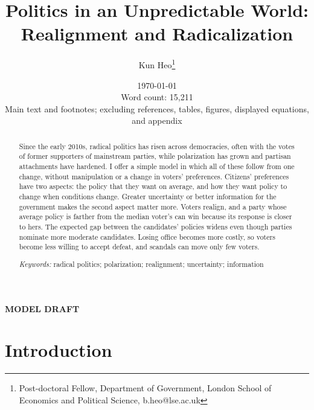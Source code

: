 \documentclass[12pt,letterpaper]{article}
\begin{document}
\begin{titlepage}
\title{\Large Politics in an Unpredictable World: Realignment and Radicalization}
\author{Kun Heo\footnote{Post-doctoral Fellow, Department of Government, London School of Economics and Political Science, b.heo@lse.ac.uk}}
\date{\today\\[1.5ex] {\normalsize Word count: 15,211}\\[0.3ex] {\footnotesize Main text and footnotes; excluding references, tables, figures, displayed equations, and appendix}}
\maketitle
\begin{center}\textbf{MODEL DRAFT}\end{center}
\begin{abstract}
\noindent Since the early 2010s, radical politics has risen across democracies, often with the votes of former supporters of mainstream parties, while polarization has grown and partisan attachments have hardened. I offer a simple model in which all of these follow from one change, without manipulation or a change in voters' preferences. Citizens' preferences have two aspects: the policy that they want on average, and how they want policy to change when conditions change. Greater uncertainty or better information for the government makes the second aspect matter more. Voters realign, and a party whose average policy is farther from the median voter's can win because its response is closer to hers. The expected gap between the candidates' policies widens even though parties nominate more moderate candidates. Losing office becomes more costly, so voters become less willing to accept defeat, and scandals can move only few voters.

\medskip\noindent\textit{Keywords:} radical politics; polarization; realignment; uncertainty; information
\end{abstract}
\thispagestyle{empty}
\setcounter{page}{0}
\end{titlepage}


\section{Introduction}
\end{document}

